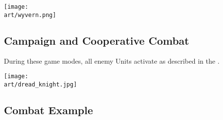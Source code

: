 \begin{multicols}{2}
\columnbreak

\begin{center}
  \texttt{[image: \\art/wyvern.png]}
\end{center}

\subsection*{Campaign and Cooperative Combat}
During these game modes, all enemy Units activate as described in the .

\end{multicols}

\vspace*{\fill}

\begin{center}
  \texttt{[image: \\art/dread\_knight.jpg]}
\end{center}

\clearpage

\subsection*{Combat Example}

